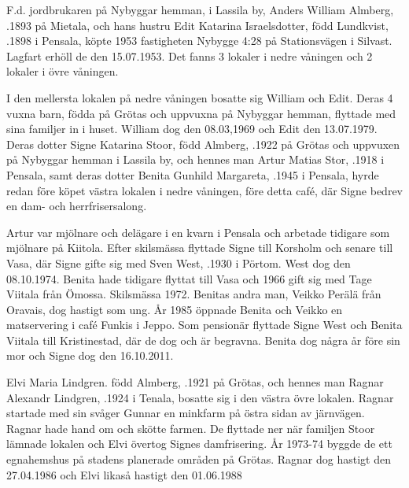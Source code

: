 F.d. jordbrukaren på Nybyggar hemman, i Lassila by, Anders William Almberg, .1893 på Mietala, och hans hustru Edit Katarina Israelsdotter, född Lundkvist, .1898 i Pensala, köpte 1953 fastigheten Nybygge 4:28 på Stationsvägen i Silvast. Lagfart erhöll de den 15.07.1953. Det fanns 3 lokaler i nedre våningen och 2 lokaler i övre våningen.

I den mellersta lokalen på nedre våningen bosatte sig William och Edit. Deras 4 vuxna barn, födda på Grötas och uppvuxna på Nybyggar hemman, flyttade med sina familjer in i huset. William dog den 08.03,1969 och Edit den 13.07.1979. Deras dotter Signe Katarina Stoor, född Almberg, .1922 på Grötas och uppvuxen på Nybyggar hemman i Lassila by, och hennes man Artur Matias Stor, .1918 i Pensala, samt deras dotter Benita Gunhild Margareta, .1945 i Pensala, hyrde redan före köpet västra lokalen i nedre våningen, före detta café, där Signe bedrev en dam- och herrfrisersalong.


Artur var mjölnare och delägare i en kvarn i Pensala och arbetade tidigare som mjölnare på Kiitola. Efter skilsmässa flyttade Signe till Korsholm och senare till Vasa, där Signe gifte sig med Sven West, .1930 i Pörtom. West dog den 08.10.1974.  Benita hade tidigare flyttat till Vasa och 1966 gift sig med Tage Viitala från Ömossa.  Skilsmässa 1972. Benitas andra man, Veikko Perälä från Oravais, dog hastigt som ung. År 1985 öppnade Benita och Veikko en matservering i café Funkis i Jeppo. Som pensionär flyttade Signe West och Benita Viitala till Kristinestad, där de dog och är begravna. Benita dog några år före sin mor och Signe dog den 16.10.2011.

Elvi Maria Lindgren. född Almberg, .1921 på Grötas, och hennes man Ragnar Alexandr Lindgren, .1924 i Tenala, bosatte sig i den västra övre lokalen. Ragnar startade med sin svåger Gunnar en minkfarm på östra sidan av järnvägen. Ragnar hade hand om och skötte farmen. De flyttade ner när familjen Stoor lämnade lokalen och Elvi övertog Signes damfrisering. År 1973-74 byggde de ett egnahemshus på stadens planerade områden på Grötas. Ragnar dog hastigt den 27.04.1986 och Elvi likaså hastigt den 01.06.1988

